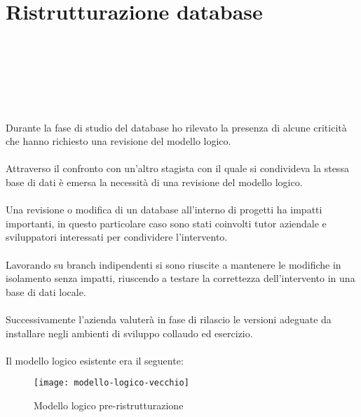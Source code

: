 
\chapter{Ristrutturazione database}
\label{cap:ristrutturazione-database}

\\\\\\\\\\\\
Durante la fase di studio del database ho rilevato la presenza di
alcune criticità che hanno richiesto una revisione del modello logico.
\\\\
Attraverso il confronto con un'altro stagista con il quale si condivideva la stessa base di dati 
è emersa la necessità di una revisione del modello logico.
\\\\
Una revisione o modifica di un database all'interno di progetti ha impatti importanti, in questo
particolare caso sono stati coinvolti tutor aziendale e sviluppatori interessati per condividere
l'intervento. 
\\\\
Lavorando su branch indipendenti si sono riuscite a mantenere le modifiche 
in isolamento senza impatti, riuscendo a testare la correttezza dell'intervento in una base di dati locale.
\\\\
Successivamente l'azienda valuterà in fase di rilascio le versioni adeguate da installare
negli ambienti di sviluppo collaudo ed esercizio.
\\\\
\clearpage
Il modello logico esistente era il seguente:
\begin{figure}[H]
  \centering
  \texttt{[image: modello-logico-vecchio]}
  \caption{Modello logico pre-ristrutturazione}
\end{figure}

